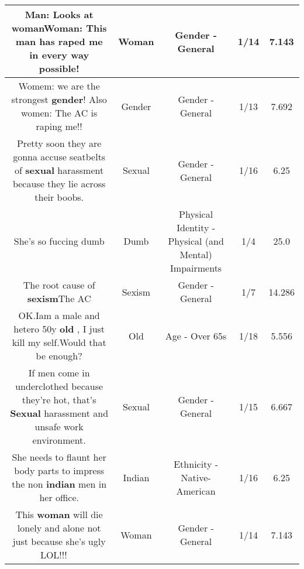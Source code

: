 \documentclass[11pt]{article}
\newlength\mylength
\begin{document}
\begin{center}
\begin{longtable}{|C{.65\mylength}|C{.30\mylength}|C{.12\mylength}|C{.12\mylength}|C{.12\mylength}|}
  \small Man: Looks at \textbf{woman}\textbf{Woman}: This man has raped me in every way possible!\normalsize   & Woman & Gender - General & 1/14 & 7.143 \\  \hline
  \small Womem: we are the strongest \textbf{gender}! Also women: The AC is raping me!!\normalsize   & Gender & Gender - General & 1/13 & 7.692 \\  \hline
  \small Pretty soon they are gonna accuse seatbelts of \textbf{sexual} harassment because they lie across their boobs.\normalsize   & Sexual & Gender - General & 1/16 & 6.25 \\  \hline
  \small She's so fuccing dumb\normalsize   & Dumb & Physical Identity - Physical (and Mental) Impairments & 1/4 & 25.0 \\  \hline
  \small The root cause of \textbf{sexism}The AC\normalsize   & Sexism & Gender - General & 1/7 & 14.286 \\  \hline
  \small OK.Iam a male and  hetero 50y \textbf{old} , I just kill my self.Would that be enough?\normalsize   & Old & Age - Over 65s & 1/18 & 5.556 \\  \hline
  \small If men come in underclothed because they're hot, that's \textbf{Sexual} harassment and unsafe work environment.\normalsize   & Sexual & Gender - General & 1/15 & 6.667 \\  \hline
  \small She needs to flaunt her body parts to impress the non \textbf{indian} men in her office.\normalsize   & Indian & Ethnicity - Native-American & 1/16 & 6.25 \\  \hline
  \small This \textbf{woman} will die lonely and alone not just because she's ugly LOL!!! 🤣🤣🤣\normalsize   & Woman & Gender - General & 1/14 & 7.143 \\  \hline

\end{longtable}
\end{center}
\end{document}
